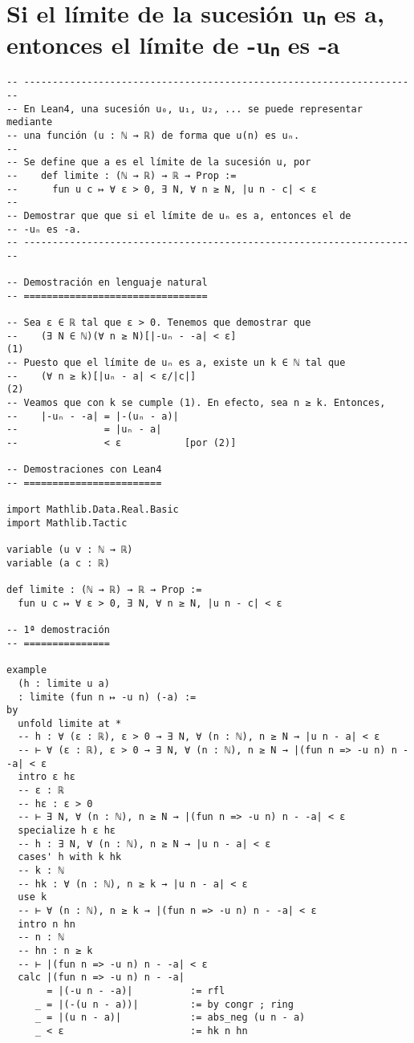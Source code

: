\section{Si el límite de la sucesión uₙ es a, entonces el límite de -uₙ es -a}
\label{sec:orgafa3334}
\begin{verbatim}
-- ---------------------------------------------------------------------
-- En Lean4, una sucesión u₀, u₁, u₂, ... se puede representar mediante
-- una función (u : ℕ → ℝ) de forma que u(n) es uₙ.
--
-- Se define que a es el límite de la sucesión u, por
--    def limite : (ℕ → ℝ) → ℝ → Prop :=
--      fun u c ↦ ∀ ε > 0, ∃ N, ∀ n ≥ N, |u n - c| < ε
--
-- Demostrar que que si el límite de uₙ es a, entonces el de
-- -uₙ es -a.
-- ---------------------------------------------------------------------

-- Demostración en lenguaje natural
-- ================================

-- Sea ε ∈ ℝ tal que ε > 0. Tenemos que demostrar que
--    (∃ N ∈ ℕ)(∀ n ≥ N)[|-uₙ - -a| < ε]                             (1)
-- Puesto que el límite de uₙ es a, existe un k ∈ ℕ tal que
--    (∀ n ≥ k)[|uₙ - a| < ε/|c|]                                    (2)
-- Veamos que con k se cumple (1). En efecto, sea n ≥ k. Entonces,
--    |-uₙ - -a| = |-(uₙ - a)|
--               = |uₙ - a|
--               < ε           [por (2)]

-- Demostraciones con Lean4
-- ========================

import Mathlib.Data.Real.Basic
import Mathlib.Tactic

variable (u v : ℕ → ℝ)
variable (a c : ℝ)

def limite : (ℕ → ℝ) → ℝ → Prop :=
  fun u c ↦ ∀ ε > 0, ∃ N, ∀ n ≥ N, |u n - c| < ε

-- 1ª demostración
-- ===============

example
  (h : limite u a)
  : limite (fun n ↦ -u n) (-a) :=
by
  unfold limite at *
  -- h : ∀ (ε : ℝ), ε > 0 → ∃ N, ∀ (n : ℕ), n ≥ N → |u n - a| < ε
  -- ⊢ ∀ (ε : ℝ), ε > 0 → ∃ N, ∀ (n : ℕ), n ≥ N → |(fun n => -u n) n - -a| < ε
  intro ε hε
  -- ε : ℝ
  -- hε : ε > 0
  -- ⊢ ∃ N, ∀ (n : ℕ), n ≥ N → |(fun n => -u n) n - -a| < ε
  specialize h ε hε
  -- h : ∃ N, ∀ (n : ℕ), n ≥ N → |u n - a| < ε
  cases' h with k hk
  -- k : ℕ
  -- hk : ∀ (n : ℕ), n ≥ k → |u n - a| < ε
  use k
  -- ⊢ ∀ (n : ℕ), n ≥ k → |(fun n => -u n) n - -a| < ε
  intro n hn
  -- n : ℕ
  -- hn : n ≥ k
  -- ⊢ |(fun n => -u n) n - -a| < ε
  calc |(fun n => -u n) n - -a|
       = |(-u n - -a)|          := rfl
     _ = |(-(u n - a))|         := by congr ; ring
     _ = |(u n - a)|            := abs_neg (u n - a)
     _ < ε                      := hk n hn


\end{verbatim}
